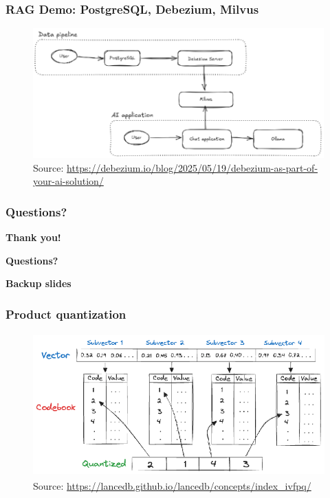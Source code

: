 \documentclass[10pt,utf8]{beamer}
\begin{document}
\begin{frame}
    \frametitle{RAG Demo: PostgreSQL, Debezium, Milvus}
    \begin{figure}
        \centering
        \includegraphics[height=5cm]{./img/dbz_milvus_demo.eps}
        \caption{\tiny{Source: \url{https://debezium.io/blog/2025/05/19/debezium-as-part-of-your-ai-solution/}}}
    \end{figure}
\end{frame}

\begin{frame}
    \frametitle{Questions?}
    \centering
     \textbf{\Huge{Thank you!}}
    
    \vspace{1.5cm}
    
    \textbf{\Huge{Questions?}}
    
    \vspace{1cm}
\end{frame}


\begin{frame}
    \centering
    \huge{\textbf{Backup slides}}
\end{frame}

\begin{frame}
    \frametitle{Product quantization}
    \begin{figure}
        \centering
        \includegraphics[height=5.5cm]{./img/product_quantization.eps}
        \caption{\tiny{Source: \url{https://lancedb.github.io/lancedb/concepts/index_ivfpq/}}}
    \end{figure}
\end{frame}
\end{document}
